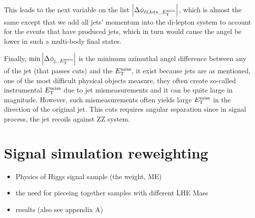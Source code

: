 This leads to the next variable on the list $\abs{\Delta\phi_{\ell\ell\mathrm{Jets}\_E_{\mathrm{T}}^{\mathrm{miss}}}}$, which
is almost the same except that we add all jets' momentum into the di-lepton system to account
for the events that have produced jets, which in turn would cause the angel be lower in such
a multi-body final states.

Finally, $\min{\abs{ \Delta\phi_{\mathrm{j}\_E_{\mathrm{T}}^{\mathrm{miss}}}}}$ is the minimum azimuthal angel difference between
any of the jet (that passes cuts) and the $E_{\mathrm{T}}^{\mathrm{miss}}$, it exist because jets are as mentioned, one of the 
most difficult physical objects measure, they often create so-called instrumental $E_{\mathrm{T}}^{\mathrm{miss}}$ due to jet
mismeasurements and it can be quite large in magnitude. However, such mismeasurements often yields large
$E_{\mathrm{T}}^{\mathrm{miss}}$ in the direction of the original jet. This cuts requires angular separation since in signal process,
the jet recoils against ZZ system.
\newpage\phantom{blabla}

\section{Signal simulation reweighting}
\begin{itemize}
    \item Physics of Higgs signal sample (the weight, ME)
    \item the need for pieceing together samples with different LHE Mass
    \item results (also see appendix A)
\end{itemize}

